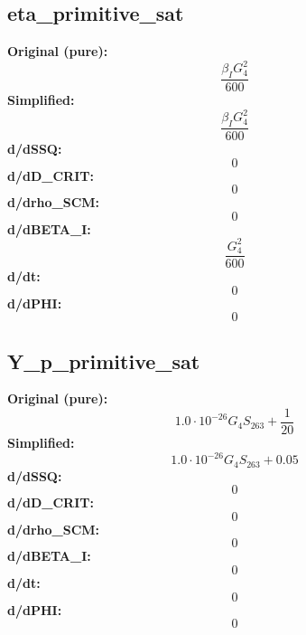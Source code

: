 \subsection{eta_primitive_sat}
\textbf{Original (pure):}
\begin{equation}
\frac{\beta_{I} G_{4}^{2}}{600}
\end{equation}
\textbf{Simplified:}
\begin{equation}
\frac{\beta_{I} G_{4}^{2}}{600}
\end{equation}
\textbf{d/dSSQ:}
\begin{equation}
0
\end{equation}
\textbf{d/dD_CRIT:}
\begin{equation}
0
\end{equation}
\textbf{d/drho_SCM:}
\begin{equation}
0
\end{equation}
\textbf{d/dBETA_I:}
\begin{equation}
\frac{G_{4}^{2}}{600}
\end{equation}
\textbf{d/dt:}
\begin{equation}
0
\end{equation}
\textbf{d/dPHI:}
\begin{equation}
0
\end{equation}

\subsection{Y_p_primitive_sat}
\textbf{Original (pure):}
\begin{equation}
1.0 \cdot 10^{-26} G_{4} S_{26 3} + \frac{1}{20}
\end{equation}
\textbf{Simplified:}
\begin{equation}
1.0 \cdot 10^{-26} G_{4} S_{26 3} + 0.05
\end{equation}
\textbf{d/dSSQ:}
\begin{equation}
0
\end{equation}
\textbf{d/dD_CRIT:}
\begin{equation}
0
\end{equation}
\textbf{d/drho_SCM:}
\begin{equation}
0
\end{equation}
\textbf{d/dBETA_I:}
\begin{equation}
0
\end{equation}
\textbf{d/dt:}
\begin{equation}
0
\end{equation}
\textbf{d/dPHI:}
\begin{equation}
0
\end{equation}

